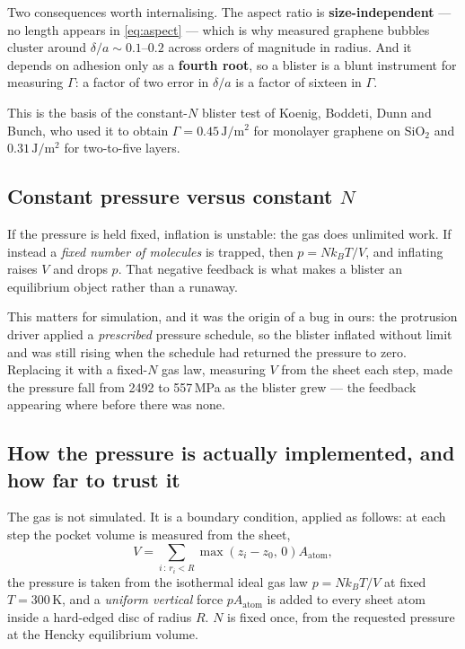 \documentclass[11pt,a4paper]{article}
\begin{document}
Two consequences worth internalising. The aspect ratio is
\textbf{size-independent} --- no length appears in \eqref{eq:aspect} --- which is
why measured graphene bubbles cluster around $\delta/a \sim 0.1$--$0.2$ across
orders of magnitude in radius. And it depends on adhesion only as a
\textbf{fourth root}, so a blister is a blunt instrument for measuring $\Gamma$:
a factor of two error in $\delta/a$ is a factor of sixteen in $\Gamma$.

This is the basis of the constant-$N$ blister test of Koenig, Boddeti, Dunn and
Bunch, who used it to obtain $\Gamma = 0.45\,\mathrm{J/m^2}$ for monolayer
graphene on SiO$_2$ and $0.31\,\mathrm{J/m^2}$ for two-to-five layers.

\subsection{Constant pressure versus constant $N$}

If the pressure is held fixed, inflation is unstable: the gas does unlimited
work. If instead a \emph{fixed number of molecules} is trapped, then
$p = Nk_BT/V$, and inflating raises $V$ and drops $p$. That negative feedback is
what makes a blister an equilibrium object rather than a runaway.

This matters for simulation, and it was the origin of a bug in ours: the
protrusion driver applied a \emph{prescribed} pressure schedule, so the blister
inflated without limit and was still rising when the schedule had returned the
pressure to zero. Replacing it with a fixed-$N$ gas law, measuring $V$ from the
sheet each step, made the pressure fall from 2492 to 557\,MPa as the blister
grew --- the feedback appearing where before there was none.

\subsection{How the pressure is actually implemented, and how far to trust it}
\label{sec:gasreal}

The gas is not simulated. It is a boundary condition, applied as follows: at
each step the pocket volume is measured from the sheet,
\begin{equation}
V = \sum_{i \,:\, r_i < R} \max\!\left(z_i - z_0,\, 0\right) A_\mathrm{atom},
\end{equation}
the pressure is taken from the isothermal ideal gas law $p = Nk_BT/V$ at fixed
$T = 300$\,K, and a \emph{uniform vertical} force $pA_\mathrm{atom}$ is added to
every sheet atom inside a hard-edged disc of radius $R$. $N$ is fixed once, from
the requested pressure at the Hencky equilibrium volume.
\end{document}
